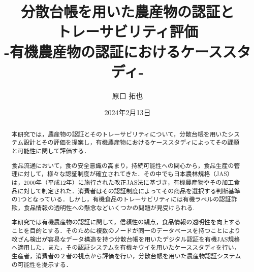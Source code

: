 \documentclass[11pt,dvipdfmx]{jreport}
\title{分散台帳を用いた農産物の認証と\\トレーサビリティ評価\\-有機農産物の認証におけるケーススタディ-}
\author{原口 拓也}
\date{2024年2月13日}	%
\begin{document}
\maketitle

\begin{abstract}
本研究では，農産物の認証とそのトレーサビリティについて，分散台帳を用いたシステム設計とその評価を提案し，有機農産物におけるケーススタディによってその課題と可能性に関して評価する．

 食品流通において，食の安全意識の高まり，持続可能性への関心から，食品生産の管理に対して，様々な認証制度が確立されてきた．その中でも日本農林規格（JAS）は，2000年（平成12年）に施行された改正JAS法に基づき，有機農産物やその加工食品に対して制定された．消費者はその認証制度によってその商品を選択する判断基準の1つとなっている．しかし，有機食品のトレーサビリティには有機ラベルの認証詐欺，食品情報の透明性への懸念などいくつかの問題が見受けられる.
 
  本研究では有機農産物の認証に関して，信頼性の観点，食品情報の透明性を向上することを目的とする．そのために複数のノードが同一のデータベースを持つことにより改ざん検出が容易なデータ構造を持つ分散台帳を用いたデジタル認証を有機JAS規格へ適用した．また，その認証システムを有機キウイを用いたケーススタディを行い，生産者，消費者の２者の視点から評価を行い，分散台帳を用いた農産物認証システムの可能性を提示する．

\end{abstract}

\tableofcontents



\newpage
{}	%


\end{document}
